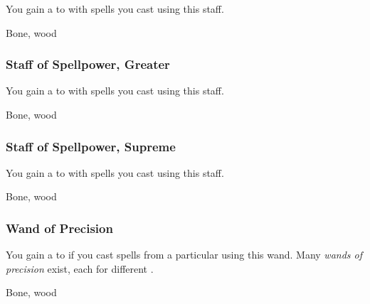 You gain a   to  with spells you cast using this staff.



 


 Bone, wood


\lowercase{\hypertarget{item:Staff of Spellpower, Greater}{}}\label{item:Staff of Spellpower, Greater}
\hypertarget{item:Staff of Spellpower, Greater}{\subsubsection{Staff of Spellpower, Greater\hfill{}}}

You gain a   to  with spells you cast using this staff.



 


 Bone, wood


\lowercase{\hypertarget{item:Staff of Spellpower, Supreme}{}}\label{item:Staff of Spellpower, Supreme}
\hypertarget{item:Staff of Spellpower, Supreme}{\subsubsection{Staff of Spellpower, Supreme\hfill{}}}

You gain a   to  with spells you cast using this staff.



 


 Bone, wood


\lowercase{\hypertarget{item:Wand of Precision}{}}\label{item:Wand of Precision}
\hypertarget{item:Wand of Precision}{\subsubsection{Wand of Precision\hfill{}}}

You gain a   to  if you cast spells from a particular  using this wand.
Many \textit{wands of precision} exist, each for different .



 


 Bone, wood


